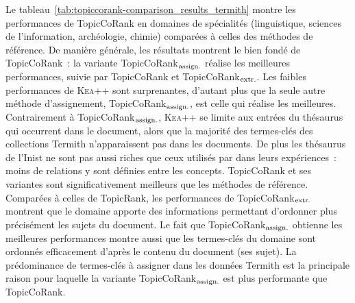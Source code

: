         Le tableau~\ref{tab:topiccorank-comparison_results_termith} montre les
        performances de TopicCoRank en domaines de spécialités (linguistique,
        sciences de l'information, archéologie, chimie) comparées à celles des
        méthodes de référence. De manière générale, les résultats montrent le
        bien fondé de TopicCoRank~: la variante
        TopicCoRank$_\textnormal{assign.}$ réalise les meilleures performances,
        suivie par TopicCoRank et TopicCoRank$_\textnormal{extr.}$. Les faibles
        performances de \textsc{Kea++} sont surprenantes, d'autant plus que la
        seule autre méthode d'assignement, TopicCoRank$_\textnormal{assign.}$,
        est celle qui réalise les meilleures. Contrairement à
        TopicCoRank$_\textnormal{assign.}$, \textsc{Kea++} se limite aux entrées
        du thésaurus qui occurrent dans le document, alors que la majorité des
        termes-clés des collections Termith n'apparaissent pas dans les
        documents. De plus les thésaurus de l'Inist ne sont pas aussi riches que
        ceux utilisés par  dans leurs expériences~:
        moins de relations y sont définies entre les concepts. TopicCoRank et
        ses variantes sont significativement meilleurs que les méthodes de
        référence. Comparées à celles de TopicRank, les performances de
        TopicCoRank$_\textnormal{extr.}$ montrent que le domaine apporte des
        informations permettant d'ordonner plus précisément les sujets du
        document. Le fait que TopicCoRank$_\textnormal{assign.}$ obtienne les
        meilleures performances montre aussi que les termes-clés du domaine sont
        ordonnés efficacement d'après le contenu du document (ses sujet). La
        prédominance de termes-clés à assigner dans les données Termith est la
        principale raison pour laquelle la variante
        TopicCoRank$_\textnormal{assign.}$ est plus performante que TopicCoRank.
